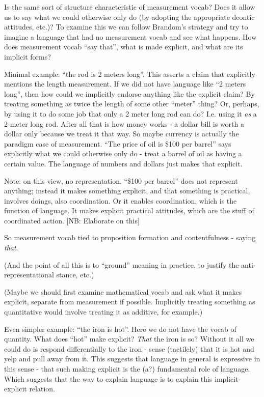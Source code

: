 \documentclass[11pt,twoside]{article}
\begin{document}
Is the same sort of structure characteristic of measurement vocab?
Does it allow us to say what we could otherwise only do (by adopting
the appropriate deontic attitudes, etc.)?  To examine this we can
follow Brandom's strategy and try to imagine a language that had no
measurement vocab and see what happens.  How does measurement vocab
``say that'', what is made explicit, and what are its implicit forms?

Minimal example: ``the rod is 2 meters long''.  This asserts a claim
that explicitly mentions the length measurement.  If we did not have
language like ``2 meters long'', then how could we implicitly endorse
anything like the explicit claim?  By treating something as twice the
length of some other ``meter'' thing?  Or, perhaps, by using it to do
some job that only a 2 meter long rod can do?  I.e. using it
\textit{as} a 2-meter long rod.  After all that is how money works - a
dollar bill is worth a dollar only because we treat it that way.  So
maybe currency is actually the paradigm case of measurement.  ``The
price of oil is \$100 per barrel'' says explicitly what we could
otherwise only do - treat a barrel of oil as having a certain value.
The language of numbers and dollars just makes that explicit.

Note: on this view, no representation.  ``\$100 per barrel'' does not
represent anything; instead it makes something explicit, and that
something is practical, involves doings, also coordination.  Or it
enables coordination, which is the function of language.  It makes
explicit practical attitudes, which are the stuff of coordinated
action.  [NB: Elaborate on this]

So measurement vocab tied to proposition formation and contentfulness
- saying \textit{that}.

(And the point of all this is to ``ground'' meaning in practice, to
justify the anti-representational stance, etc.)

(Maybe we should first examine mathematical vocab and ask what it
makes explicit, separate from measurement if possible.  Implicitly
treating something as quantitative would involve treating it as
additive, for example.)

Even simpler example: ``the iron is hot''.  Here we do not have the
vocab of quantity.  What does ``hot'' make explicit?  \textit{That}
the iron is so?  Without it all we could do is respond differentially
to the iron - sense (tactilely) that it is hot and yelp and pull away
from it.  This suggests that language in general is expressive in this
sense - that such making explicit is the (a?) fundamental role of
language.  Which suggests that the way to explain language is to
explain this implicit-explicit relation.
\end{document}
